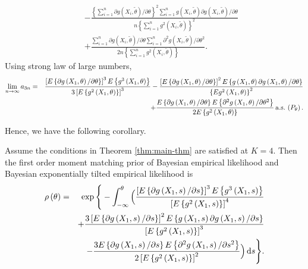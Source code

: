 \begin{example}
\begin{eqnarray*}
 &  & -\frac{\left\{ \sum_{i=1}^{n}\partial g\left(X_{i},\tilde{\theta}\right)/\partial\theta\right\} ^{2}\sum_{i=1}^{n}g\left(X_{i},\tilde{\theta}\right)\partial g\left(X_{i},\tilde{\theta}\right)/\partial\theta}{n\left\{ \sum_{i=1}^{n}g^{2}\left(X_{i},\tilde{\theta}\right)\right\} ^{2}}\\
 &  & +\frac{\sum_{i=1}^{n}\partial g\left(X_{i},\tilde{\theta}\right)/\partial\theta\sum_{i=1}^{n}\partial^{2}g\left(X_{i},\tilde{\theta}\right)/\partial\theta^{2}}{2n\left\{ \sum_{i=1}^{n}g^{2}\left(X_{i},\tilde{\theta}\right)\right\} }.
\end{eqnarray*}
Using strong law of large numbers,
\begin{eqnarray*}
\lim_{n\rightarrow\infty}a_{3n} & = & \frac{\left[E\left\{ \partial g\left(X_{1},\theta \right)/\partial\theta\right\} \right]^{3}E\left\{ g^{3}\left(X_{1},\theta\right)\right\} }{3\left[E\left\{ g^{2}\left(X_{1},\theta\right)\right\} \right]^{3}}-\frac{\left[E\left\{ \partial g\left(X_{1},\theta\right)/\partial\theta\right\} \right]^{2}E\left\{ g\left(X_{1},\theta\right)\partial g\left(X_{1},\theta\right)/\partial\theta\right\} }{\left\{ Eg^{2}\left(X_{1},\theta\right)\right\} ^{2}}\\
 &  & +\frac{E\left\{ \partial g\left(X_{1},\theta\right)/\partial\theta\right\} E\left\{ \partial^{2}g\left(X_{1},\theta\right)/\partial\theta^{2}\right\} }{2E\left\{ g^{2}\left(X_{1},\theta\right)\right\} }\,\mathrm{a.s.}\, \left (P_{\theta} \right).
\end{eqnarray*}
 \end{example}
 Hence, we have the following corollary.
\begin{corollary}
\label{cor:moment-matching-prior}
Assume the conditions in Theorem \ref{thm:main-thm} are satisfied
at $K=4$. Then the first order moment matching prior of Bayesian
empirical likelihood and Bayesian exponentially tilted empirical likelihood
 is 
\begin{eqnarray*}
\rho\left(\theta\right) & = & \exp\Bigg\{-\int_{-\infty}^{\theta}\Big(\frac{\left[E\left\{ \partial g\left(X_{1},s\right)/\partial s\right\} \right]^{3}E\left\{ g^{3}\left(X_{1},s\right)\right\} }{\left[E\left\{ g^{2}\left(X_{1},s\right)\right\} \right]^{4}}\\
&&+\frac{3\left[E\left\{ \partial g\left(X_{1},s\right)/\partial s\right\} \right]^{2}E\left\{ g\left(X_{1},s\right)\partial g\left(X_{1},s\right)/\partial s\right\} }{\left[E\left\{ g^{2}\left(X_{1},s\right)\right\} \right]^{3}}\\
 &  & -\frac{3E\left\{ \partial g\left(X_{1},s\right)/\partial s\right\} E\left\{\partial^{2}g\left(X_{1},s\right)/\partial s^{2}\right\}}{2\left[E\left\{ g^{2}\left(X_{1},s\right)\right\} \right]^{2}}\Big)\,\mathrm{d} s\Bigg\}.
\end{eqnarray*}

\end{corollary}


